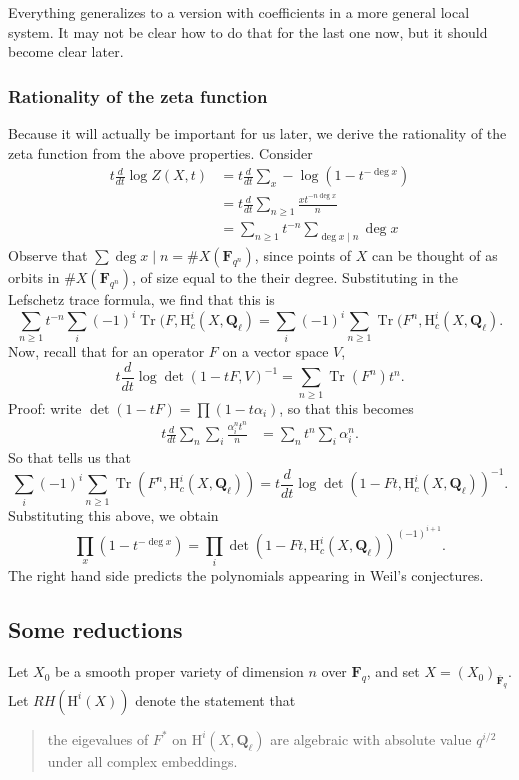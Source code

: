 \documentclass[letterpaper,11pt]{article}
\DeclareMathOperator{\Tr}{Tr}
\newcommand{\F}{\mathbf{F}}
\newcommand{\Q}{\mathbf{Q}}
\newcommand{\ol}[1]{\overline{#1}}
\newcommand{\mrm}[1]{\mathrm{#1}}
\begin{document}
Everything generalizes to a version with coefficients in a more general local system. It may not be clear how to do that for the last one now, but it should become clear later. 

\subsubsection{Rationality of the zeta function}
Because it will actually be important for us later, we derive the rationality of the zeta function from the above properties. Consider 
\begin{align*}
t \frac{d}{dt} \log Z(X,t) &= t \frac{d}{dt} \sum_x -\log(1-t^{-\deg x})\\
&= t \frac{d}{dt} \sum_{n \geq 1} \frac{ x t^{-n \deg x}}{n} \\
&= \sum_{n \geq 1} t^{-n} \sum_{\deg x \mid n } \deg x
\end{align*}
Observe that $\sum \deg x \mid n = \# X(\F_{q^n})$, since points of $X$ can be thought of as orbits in $\# X(\F_{q^n})$, of size equal to the their degree. Substituting in the Lefschetz trace formula, we find that this is 
\[
\sum_{n \geq 1} t^{-n} \sum_i (-1)^i \Tr(F, \mrm{H}_c^i(X, \Q_{\ell})  = \sum_i (-1)^i \sum_{n \geq 1} \Tr(F^n, \mrm{H}_c^i(X, \Q_{\ell}).
\]
Now, recall that for an operator $F$ on a vector space $V$, 
\[
t \frac{d}{dt} \log \det (1-tF, V)^{-1}= \sum_{n \geq 1} \Tr(F^n) t^n.
\]
Proof: write $\det (1-tF) = \prod (1-t\alpha_i)$, so that this becomes
\begin{align*}
t \frac{d}{dt}  \sum_n \sum_i \frac{\alpha_i^n t^n}{n} &= \sum_n t^n \sum_i \alpha_i^n .
\end{align*}
So that tells us that 
\[
\sum_i (-1)^i \sum_{n \geq 1} \Tr(F^n, \mrm{H}_c^i(X, \Q_{\ell})) = t \frac{d}{dt} \log \det(1-Ft, \mrm{H}_c^i(X, \Q_{\ell}))^{-1}.
\]
Substituting this above, we obtain 
\[
\prod_x (1-t^{-\deg x}) =  \prod_i \det(1-Ft, \mrm{H}_c^i(X, \Q_{\ell}))^{(-1)^{i+1}}.
\]
The right hand side predicts the polynomials appearing in Weil's conjectures.


\subsection{Some reductions}

Let $X_0$ be a smooth proper variety of dimension $n$ over $\F_q$, and set $X = (X_0)_{\ol{\F}_q}$. Let $RH(\mrm{H}^i(X))$ denote the statement that

\begin{quote}
 the eigevalues of $F^*$ on $\mrm{H}^i(X, \Q_{\ell})$ are algebraic with absolute value $q^{i/2}$ under all complex embeddings.
 \end{quote}
 
\end{document}

